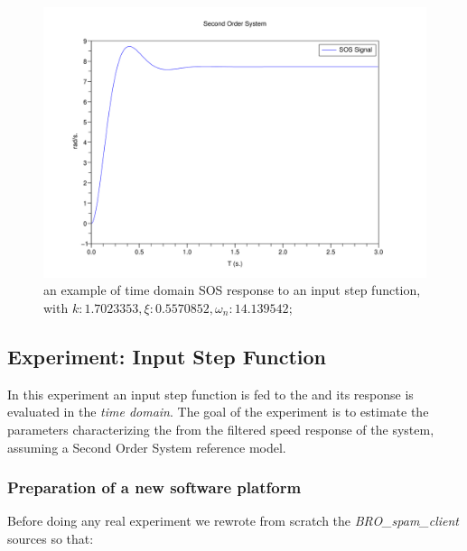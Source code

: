 \begin{figure}[htbp]
  \begin{center}
  \includegraphics[scale=0.16]{FIGURES_1/Second_Order_System.png}
    \caption[SOS Response]{an example of time domain SOS response to an input step function, with $k: 1.7023353, \xi{}: 0.5570852, \omega_n{}: 14.139542$;}
    \label{fig:responseSOS}
  \end{center}
\end{figure}


\subsection{Experiment: Input Step Function}

In this experiment an input step function is fed to the \LEGOMOTOR{} and its response is evaluated in the \textit{time domain}. The goal of the experiment is to estimate the parameters characterizing the \LEGOMOTOR{} from the filtered speed response of the system, assuming a Second Order System reference model.

\subsubsection{Preparation of a new software platform}

Before doing any real experiment we rewrote from scratch the \textit{BRO\_{}spam\_{}client} sources so that:

